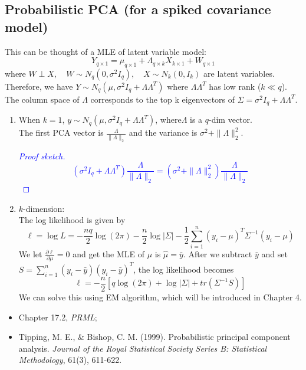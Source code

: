 \documentclass[12pt]{book}
\theoremstyle{definition}
\theoremstyle{remark}
\begin{document}
\subsection{Probabilistic PCA (for a spiked covariance model)}
This can be thought of a MLE of latent variable model:
\[Y_{q\times 1} = \mu_{q\times 1} + \Lambda_{q\times k} X_{k\times 1}+ W_{q\times 1}\]
where $W \perp X, \quad W \sim N_q(0,\sigma^2I_q), \quad X\sim N_k(0, I_k)$ are latent variables. \\
Therefore, we have $Y\sim N_q(\mu, \sigma^2 I_q+\Lambda \Lambda^T)$ where $\Lambda\Lambda^T$ has low rank ($k \ll q$). The column space of $\Lambda$ corresponds to the top k eigenvectors of $\Sigma = \sigma^2 I_q+\Lambda \Lambda^T$.
\begin{enumerate}
    \item When $k=1$, $y \sim N_q(\mu, \sigma^2 I_q+\Lambda \Lambda^T)$, where$\Lambda$ is a $q$-dim vector.\\
    The first PCA vector is $\frac{\Lambda}{\|\Lambda\|_2}$ and the variance is $\sigma^2+ \|\Lambda\|_2^2$.
    \textcolor{blue}{
    \begin{proof}[Proof sketch]
        \[(\sigma^2 I_q+\Lambda \Lambda^T)\frac{\Lambda}{\|\Lambda\|_2} = (\sigma^2+ \|\Lambda\|_2^2)\frac{\Lambda}{\|\Lambda\|_2}\]
    \end{proof}}
    \item $k$-dimension:\\
    The log likelihood is given by
    \[\ell = \log L = -\frac{nq}{2}\log(2\pi) - \frac{n}{2} \log|\Sigma| - \frac{1}{2}\sum_{i=1}^n (y_i-\mu)^T \Sigma^{-1}(y_i - \mu)\]
    We let $\frac{\partial \ell}{\partial \mu} = 0$ and get the MLE of $\mu$ is $\hat{\mu} = \bar{y}$.
    After we subtract $\bar{y}$ and set $S = \sum_{i=1}^n (y_i-\bar{y})(y_i - \bar{y})^T$, the log likelihood becomes
    \[\ell = -\frac{n}{2}[q\log(2\pi) + \log|\Sigma| + tr(\Sigma^{-1}S)]\]
    We can solve this using EM algorithm, which will be introduced in Chapter 4.
\end{enumerate}

\begin{referencebox}
    \begin{itemize}
        \item Chapter 17.2, \textit{PRML};
        \item Tipping, M. E., \& Bishop, C. M. (1999). Probabilistic principal component analysis. \textit{Journal of the Royal Statistical Society Series B: Statistical Methodology}, 61(3), 611-622.
    \end{itemize}
\end{referencebox}
\end{document}
